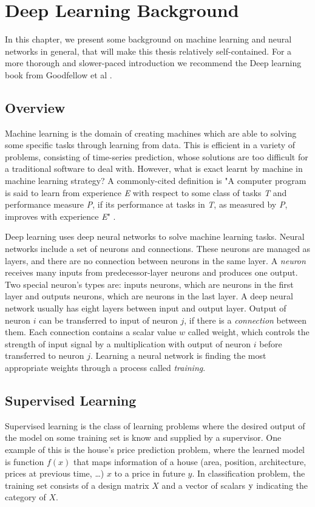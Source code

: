 \chapter{Deep Learning Background}
\label{chap-2-dl-background}
\begin{ChapAbstract}
In this chapter, we present some background on machine learning and neural networks in general, that will make this thesis relatively self-contained. For a more thorough and slower-paced introduction we recommend the Deep learning book from Goodfellow et al \cite{dlbook}.
\end{ChapAbstract}

\section{Overview}
Machine learning is the domain of creating machines which are able to solving some specific tasks through learning from data. This is efficient in a variety of problems, consisting of time-series prediction, whose solutions are too difficult for a traditional software to deal with. However, what is exact learnt by machine in machine learning strategy? A commonly-cited definition is "A computer program is said to learn from experience \textit{E} with respect to some class of tasks \textit{T} and performance measure \textit{P}, if its performance at tasks in \textit{T}, as measured by \textit{P}, improves with experience \textit{E}" \cite{Mitchell:1997:ML}.

Deep learning uses deep neural networks to solve machine learning tasks. Neural networks include a set of neurons and connections. These neurons are managed as layers, and there are no connection between neurons in the same layer. A \textit{neuron} receives many inputs from predecessor-layer neurons and produces one output. Two special neuron's types are: inputs neurons, which are neurons in the first layer and outputs neurons, which are neurons in the last layer. A deep neural network usually has eight layers between input and output layer. Output of neuron $i$ can be transferred to input of neuron $j$, if there is a \textit{connection} between them. Each connection contains a scalar value $w$ called weight, which controls the strength of input signal by a multiplication with output of neuron $i$ before transferred to neuron $j$. Learning a neural network is finding the most appropriate weights through a process called \textit{training}.

\section{Supervised Learning}
Supervised learning is the class of learning problems where the desired output of the model on some training set is know and supplied by a supervisor. One example of this is the house's price prediction problem, where the learned model is function $\displaystyle f(x)$ that maps information of a house (area, position, architecture, prices at previous time, \dots) $\displaystyle x$ to a price in future $\displaystyle y$. In classification problem, the training set consists of a design matrix $\displaystyle X$ and a vector of scalars $\displaystyle {\textnormal{y}}$ indicating the category of $\displaystyle X$. 


